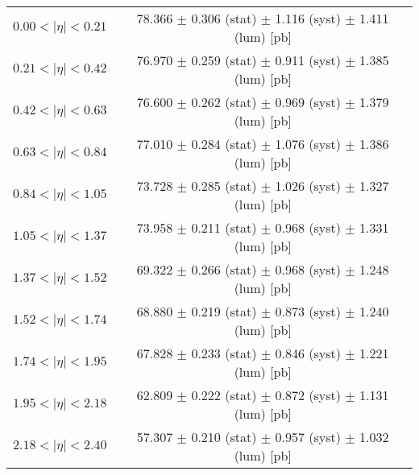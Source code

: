 \begin{tabular}{lc}
\hline
$0.00 < |\eta| <0.21$          & 78.366 $\pm$ 0.306 (stat) $\pm$ 1.116 (syst) $\pm$ 1.411 (lum) [pb]  \\
$0.21 < |\eta| <0.42$          & 76.970 $\pm$ 0.259 (stat) $\pm$ 0.911 (syst) $\pm$ 1.385 (lum) [pb]  \\
$0.42 < |\eta| <0.63$          & 76.600 $\pm$ 0.262 (stat) $\pm$ 0.969 (syst) $\pm$ 1.379 (lum) [pb]  \\
$0.63 < |\eta| <0.84$          & 77.010 $\pm$ 0.284 (stat) $\pm$ 1.076 (syst) $\pm$ 1.386 (lum) [pb]  \\
$0.84 < |\eta| <1.05$          & 73.728 $\pm$ 0.285 (stat) $\pm$ 1.026 (syst) $\pm$ 1.327 (lum) [pb]  \\
$1.05 < |\eta| <1.37$          & 73.958 $\pm$ 0.211 (stat) $\pm$ 0.968 (syst) $\pm$ 1.331 (lum) [pb]  \\
$1.37 < |\eta| <1.52$          & 69.322 $\pm$ 0.266 (stat) $\pm$ 0.968 (syst) $\pm$ 1.248 (lum) [pb]  \\
$1.52 < |\eta| <1.74$          & 68.880 $\pm$ 0.219 (stat) $\pm$ 0.873 (syst) $\pm$ 1.240 (lum) [pb]  \\
$1.74 < |\eta| <1.95$          & 67.828 $\pm$ 0.233 (stat) $\pm$ 0.846 (syst) $\pm$ 1.221 (lum) [pb]  \\
$1.95 < |\eta| <2.18$          & 62.809 $\pm$ 0.222 (stat) $\pm$ 0.872 (syst) $\pm$ 1.131 (lum) [pb]  \\
$2.18 < |\eta| <2.40$          & 57.307 $\pm$ 0.210 (stat) $\pm$ 0.957 (syst) $\pm$ 1.032 (lum) [pb]  \\
\hline
\end{tabular}
